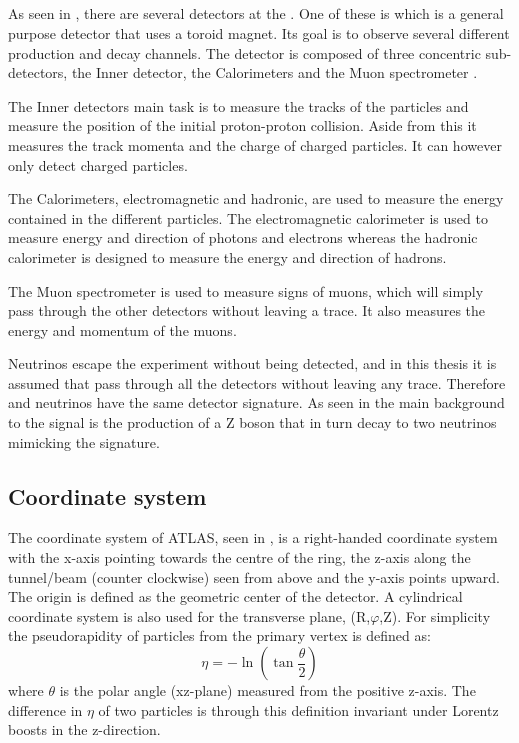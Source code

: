 \subsection{\abbrATLAS}\label{ATLAS}
As seen in , there are several detectors at the \abbrLHC. One of these is \abbrATLAS which is a general purpose detector that uses a toroid magnet. Its goal is to observe several different production and decay channels. The detector is composed of three concentric sub-detectors, the Inner detector, the Calorimeters and the Muon spectrometer \citep{1129811}.

The Inner detectors main task is to measure the tracks of the particles and measure the position of the initial proton-proton collision. Aside from this it measures the track momenta and the charge of charged particles. It can however only detect charged particles.

The Calorimeters, electromagnetic and hadronic, are used to measure the energy contained in the different particles. The electromagnetic calorimeter is used to measure energy and direction of photons and electrons whereas the hadronic calorimeter is designed to measure the energy and direction of hadrons.

The Muon spectrometer is used to measure signs of muons, which will simply pass through the other detectors without leaving a trace. It also measures the energy and momentum of the muons.

Neutrinos escape the \abbrATLAS experiment without being detected, and in this thesis it is assumed that \abbrWIMPS pass through all the detectors without leaving any trace. Therefore \abbrWIMPS and neutrinos have the same detector signature. As seen in  the main background to the \abbrWIMP signal is the production of a Z boson that in turn decay to two neutrinos mimicking the \abbrWIMP signature.
\newpage
\subsection{Coordinate system}\label{sec:eo:subsec:coord}
The coordinate system of ATLAS, seen in , is a right-handed coordinate system with the x-axis pointing towards the centre of the \abbrLHC ring, the z-axis along the tunnel/beam (counter clockwise) seen from above and the y-axis points upward. The origin is defined as the geometric center of the detector. A cylindrical coordinate system is also used for the transverse plane, (R,$\varphi$,Z).
For simplicity the pseudorapidity of particles from the primary vertex is defined as:
\begin{equation}
\eta = - \ln( \tan\frac{\theta}{2})
\end{equation}
where $\theta$ is the polar angle (xz-plane) measured from the positive z-axis. The difference in $\eta$ of two particles is through this definition invariant under Lorentz boosts in the z-direction.

